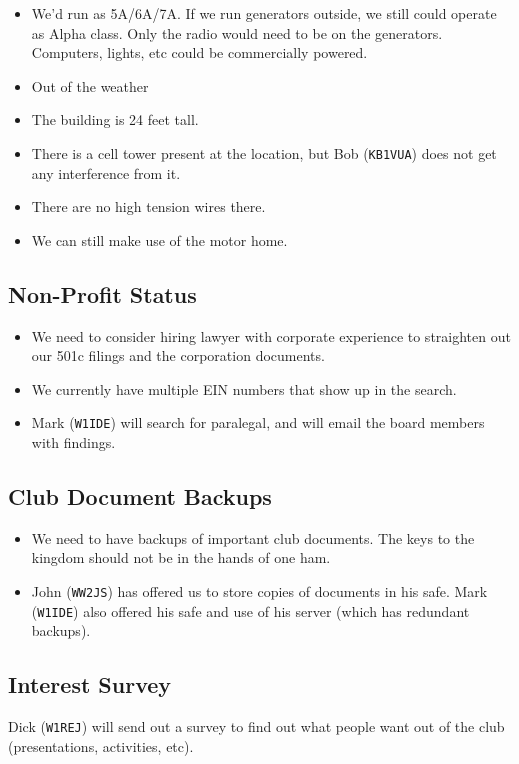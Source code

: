 \documentclass[10pt,letterpaper]{article}
\begin{document}
\begin{itemize}
\item We'd run as 5A/6A/7A. If we run generators outside, we still could operate as Alpha class. Only the radio would need to be on the generators. Computers, lights, etc could be commercially powered.
\item Out of the weather
\item The building is 24 feet tall.
\item There is a cell tower present at the location, but Bob (\texttt{KB1VUA}) does not get any interference from it.
\item There are no high tension wires there.
\item We can still make use of the motor home.
\end{itemize}

\subsection{Non-Profit Status}
\begin{itemize}
\item We need to consider hiring lawyer with corporate experience to straighten out our 501c filings and the corporation documents.
\item We currently have multiple EIN numbers that show up in the search.
\item Mark (\texttt{W1IDE}) will search for paralegal, and will email the board members with findings.
\end{itemize}

\subsection{Club Document Backups}
\begin{itemize}
\item We need to have backups of important club documents. The keys to the kingdom should not be in the hands of one ham.
\item John (\texttt{WW2JS}) has offered us to store copies of documents in his safe. Mark (\texttt{W1IDE}) also offered his safe and use of his server (which has redundant backups).
\end{itemize}


\subsection{Interest Survey}
Dick (\texttt{W1REJ}) will send out a survey to find out what people want out of the club (presentations, activities, etc).
\end{document}
